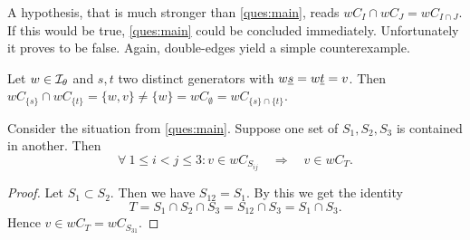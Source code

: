 A hypothesis, that is much stronger than \ref{ques:main}, reads $wC_I \cap wC_J = wC_{I \cap J}$. If this would be true, \ref{ques:main} could be concluded immediately. Unfortunately it proves to be false. Again, double-edges yield a simple counterexample.

\begin{exam}
	Let $w \in \mathcal{I}_{\theta}$ and $s,t$ two distinct generators with $w \underline{s} = w \underline{t} = v$. Then $wC_{\{s\}} \cap wC_{\{t\}} = \{w,v\} \neq \{w\} = wC_{\emptyset} = wC_{\{s\} \cap \{t\}}$.
\end{exam}

\begin{prop}
	Consider the situation from \ref{ques:main}. Suppose one set of $S_1,S_2,S_3$ is contained in another. Then
	$$ \forall \ 1 \leq i < j \leq 3 : v \in w C_{S_{ij}} \quad \Rightarrow \quad v \in w C_T. $$

	\begin{proof}
		Let $S_1 \subset S_2$. Then we have $S_{12} = S_1$. By this we get the identity
		$$ T = S_1 \cap S_2 \cap S_3 = S_{12} \cap S_3 = S_1 \cap S_3. $$
		Hence $v \in w C_T = w C_{S_{31}}$.
	\end{proof}
\end{prop}
